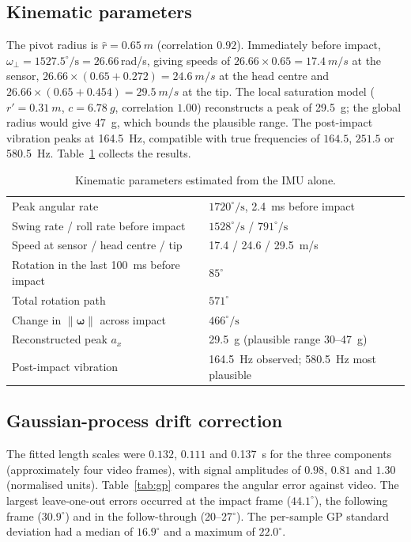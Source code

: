 \documentclass[11pt,a4paper]{article}
\newcommand{\w}{\bm{\omega}}
\newcommand{\dg}{^{\circ}}
\newcommand{\norm}[1]{\left\lVert #1 \right\rVert}
\begin{document}
\subsection{Kinematic parameters}
The pivot radius is $\hat r=\SI{0.65}{m}$ (correlation $0.92$). Immediately before impact,
$\omega_\perp=1527.5\dg/\mathrm{s}=26.66$\,rad/s, giving speeds of
$26.66\times0.65=\SI{17.4}{m/s}$ at the sensor, $26.66\times(0.65+0.272)=\SI{24.6}{m/s}$ at the head
centre and $26.66\times(0.65+0.454)=\SI{29.5}{m/s}$ at the tip. The local saturation model
($r'=\SI{0.31}{m}$, $c=\SI{6.78}{g}$, correlation $1.00$) reconstructs a peak of \SI{29.5}{g}; the
global radius would give \SI{47}{g}, which bounds the plausible range. The post-impact vibration
peaks at \SI{164.5}{Hz}, compatible with true frequencies of $164.5$, $251.5$ or \SI{580.5}{Hz}.
Table~\ref{tab:params} collects the results.

\begin{table}[H]\centering\small
\caption{Kinematic parameters estimated from the IMU alone.}\label{tab:params}
\begin{tabular}{@{}ll@{}}\toprule
Peak angular rate & $1720\dg/\mathrm{s}$, \SI{2.4}{ms} before impact \\
Swing rate / roll rate before impact & $1528\dg/\mathrm{s}$ / $791\dg/\mathrm{s}$ \\
Speed at sensor / head centre / tip & 17.4 / 24.6 / \SI{29.5}{m/s} \\
Rotation in the last \SI{100}{ms} before impact & $85\dg$ \\
Total rotation path & $571\dg$ \\
Change in $\norm{\w}$ across impact & $466\dg/\mathrm{s}$ \\
Reconstructed peak $a_x$ & \SI{29.5}{g} (plausible range 30--\SI{47}{g}) \\
Post-impact vibration & \SI{164.5}{Hz} observed; \SI{580.5}{Hz} most plausible \\\bottomrule
\end{tabular}
\end{table}

\subsection{Gaussian-process drift correction}
The fitted length scales were $0.132$, $0.111$ and \SI{0.137}{s} for the three components
(approximately four video frames), with signal amplitudes of $0.98$, $0.81$ and $1.30$ (normalised
units). Table~\ref{tab:gp} compares the angular error against video. The largest leave-one-out
errors occurred at the impact frame ($44.1\dg$), the following frame ($30.9\dg$) and in the
follow-through (20--27$\dg$). The per-sample GP standard deviation had a median of $16.9\dg$ and a
maximum of $22.0\dg$.
\end{document}
